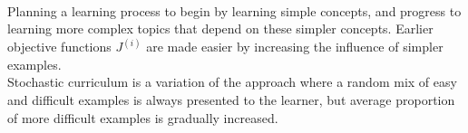 \begin{remark} \\
Planning a learning process to begin by learning simple concepts, and progress to learning more complex topics that depend on these simpler concepts. Earlier objective functions $J^{(i)}$ are made easier by increasing the influence of simpler examples.\\
Stochastic curriculum is a variation of the approach where a random mix of easy and difficult examples is always presented to the learner, but average proportion of more difficult examples is gradually increased.
\end{remark}
